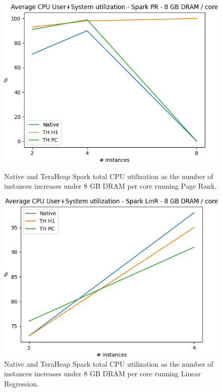 \begin{figure}[thbp]
        \centering
        \includegraphics[width=\linewidth]{./fig/PR_64_UTIL.png}
    \caption{Native and TeraHeap Spark total CPU utilization
        as the number of instances increases under 8 GB DRAM per core running Page Rank.}
\label{fig:pr_64_util}
        \includegraphics[width=\linewidth]{./fig/LINR_64_UTIL.png}
    \caption{Native and TeraHeap Spark total CPU utilization
        as the number of instances increases under 8 GB DRAM per core running Linear Regression.}
                \label{fig:linr_64_util}
\end{figure}

